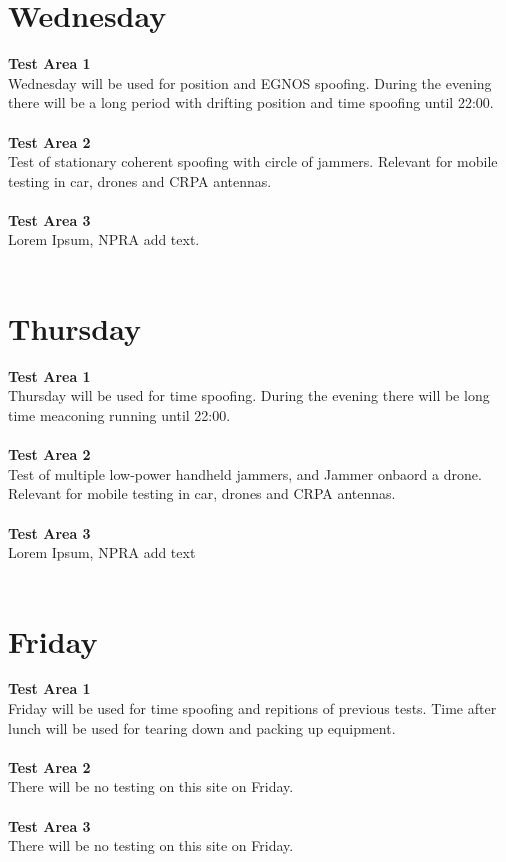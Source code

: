 \documentclass[a4paper]{book}
\begin{document}
\begin{landscape}
\chapter{Wednesday}
\Large \textbf{Test Area 1} \\
Wednesday will be used for position and EGNOS spoofing. During the evening there will be a long period with drifting position and time spoofing until 22:00. \\ \\
\Large \textbf{Test Area 2} \\
Test of stationary coherent spoofing with circle of jammers. Relevant for mobile testing in car, drones and CRPA antennas.\\ \\
\Large \textbf{Test Area 3} \\
Lorem Ipsum, NPRA add text.\\ \\

%

\chapter{Thursday}
\Large \textbf{Test Area 1} \\
Thursday will be used for time spoofing. During the evening there will be long time meaconing running until 22:00.\\ \\
\Large \textbf{Test Area 2} \\
Test of multiple low-power handheld jammers, and Jammer onbaord a drone. Relevant for mobile testing in car, drones and CRPA antennas.\\ \\
\Large \textbf{Test Area 3} \\
Lorem Ipsum, NPRA add text\\ \\

%

\chapter{Friday}
\Large \textbf{Test Area 1} \\
Friday will be used for time spoofing and repitions of previous tests. Time after lunch will be used for tearing down and packing up equipment.\\ \\
\Large \textbf{Test Area 2} \\
There will be no testing on this site on Friday.\\ \\
\Large \textbf{Test Area 3} \\
There will be no testing on this site on Friday.\\ \\

%

\end{landscape}
\end{document}
